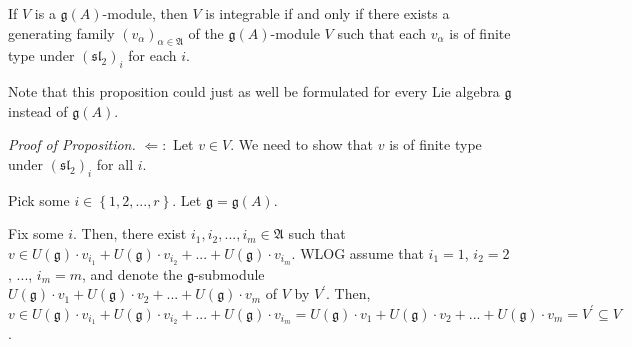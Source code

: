 \documentclass[etingof-lie.tex]{subfiles}
\begin{document}
\begin{proposition}
If $V$ is a $\mathfrak{g}\left(  A\right)  $-module, then $V$ is integrable if
and only if there exists a generating family $\left(  v_{\alpha}\right)
_{\alpha\in\mathfrak{A}}$ of the $\mathfrak{g}\left(  A\right)  $-module $V$
such that each $v_{\alpha}$ is of finite type under $\left(  \mathfrak{sl}%
_{2}\right)  _{i}$ for each $i$.
\end{proposition}

Note that this proposition could just as well be formulated for every Lie
algebra $\mathfrak{g}$ instead of $\mathfrak{g}\left(  A\right)  $.

\textit{Proof of Proposition.} $\Longleftarrow:$ Let $v\in V$. We need to show
that $v$ is of finite type under $\left(  \mathfrak{sl}_{2}\right)  _{i}$ for
all $i$.

Pick some $i\in\left\{  1,2,...,r\right\}  $. Let $\mathfrak{g}=\mathfrak{g}%
\left(  A\right)  $.

Fix some $i$. Then, there exist $i_{1},i_{2},...,i_{m}\in\mathfrak{A}$ such
that $v\in U\left(  \mathfrak{g}\right)  \cdot v_{i_{1}}+U\left(
\mathfrak{g}\right)  \cdot v_{i_{2}}+...+U\left(  \mathfrak{g}\right)  \cdot
v_{i_{m}}$. WLOG assume that $i_{1}=1$, $i_{2}=2$, $...$, $i_{m}=m$, and
denote the $\mathfrak{g}$-submodule $U\left(  \mathfrak{g}\right)  \cdot
v_{1}+U\left(  \mathfrak{g}\right)  \cdot v_{2}+...+U\left(  \mathfrak{g}%
\right)  \cdot v_{m}$ of $V$ by $V^{\prime}$. Then, $v\in U\left(
\mathfrak{g}\right)  \cdot v_{i_{1}}+U\left(  \mathfrak{g}\right)  \cdot
v_{i_{2}}+...+U\left(  \mathfrak{g}\right)  \cdot v_{i_{m}}=U\left(
\mathfrak{g}\right)  \cdot v_{1}+U\left(  \mathfrak{g}\right)  \cdot
v_{2}+...+U\left(  \mathfrak{g}\right)  \cdot v_{m}=V^{\prime}\subseteq V$.
\end{document}

